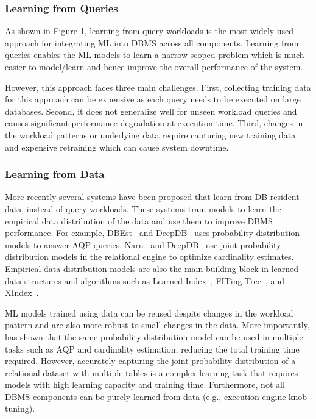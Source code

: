 \subsubsection{Learning from Queries} As shown in Figure 1, learning from query workloads is the most widely used approach for integrating ML into DBMS across all components.
Learning from queries enables the ML models to learn a narrow scoped problem which is much easier to model/learn and hence improve the overall performance of the system.

However, this approach faces three main challenges.
First, collecting training data for this approach can be expensive as each query needs to be executed on large databases.
Second, it does not generalize well for unseen workload queries and causes significant performance degradation at execution time.
Third, changes in the workload patterns or underlying data require capturing new training data and expensive retraining which can cause system downtime.

\subsubsection{Learning from Data} More recently several systems have been proposed that learn from DB-resident data, instead of query workloads.
These systems train models to learn the empirical data distribution of the data and use them to improve DBMS performance.
For example, DBEst~\cite{dbest} and DeepDB~\cite{deepdb} uses probability distribution models to answer AQP queries.
Naru~\cite{naru} and DeepDB~\cite{deepdb} use joint probability distribution models in the relational engine to optimize cardinality estimates.
Empirical data distribution models are also the main building block in learned data structures and algorithms such as Learned Index~\cite{learnedindex}, FITing-Tree~\cite{fitingtree}, and XIndex~\cite{xindex}.

ML models trained using data can be reused despite changes in the workload pattern and are also more robust to small changes in the data.
More importantly, \cite{deepdb} has shown that the same probability distribution model can be used in multiple tasks such as AQP and cardinality estimation, reducing the total training time required.
However, accurately capturing the joint probability distribution of a relational dataset with multiple tables is a complex learning task that requires models with high learning capacity and training time.
Furthermore, not all DBMS components can be purely learned from data (e.g., execution engine knob tuning).


